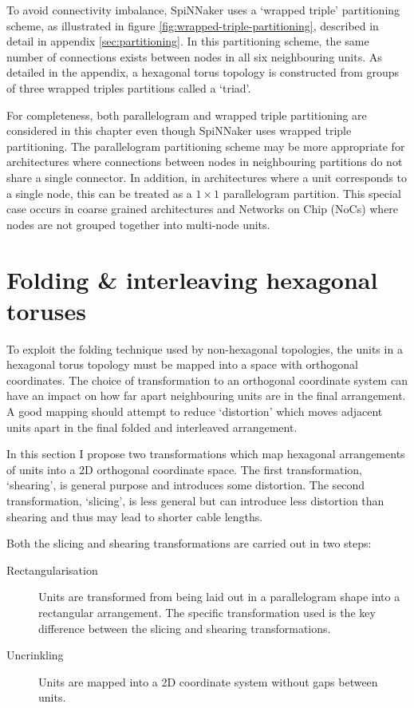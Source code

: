 		To avoid connectivity imbalance, SpiNNaker uses a `wrapped triple'
		partitioning scheme, as illustrated in figure
		\ref{fig:wrapped-triple-partitioning}, described in detail in appendix
		\ref{sec:partitioning}. In this partitioning scheme, the same number of
		connections exists between nodes in all six neighbouring units. As detailed
		in the appendix, a hexagonal torus topology is constructed from groups of
		three wrapped triples partitions called a `triad'.
		
		For completeness, both parallelogram and wrapped triple partitioning are
		considered in this chapter even though SpiNNaker uses wrapped triple
		partitioning. The parallelogram partitioning scheme may be more appropriate
		for architectures where connections between nodes in neighbouring
		partitions do not share a single connector. In addition, in architectures
		where a unit corresponds to a single node, this can be treated as a $1
		\times 1$ parallelogram partition.  This special case occurs in coarse
		grained architectures and Networks on Chip (NoCs) where nodes are not
		grouped together into multi-node units.
	
	\section{Folding \& interleaving hexagonal toruses}
		
		To exploit the folding technique used by non-hexagonal topologies,
		the units in a hexagonal torus topology must be mapped into a space with
		orthogonal coordinates. The choice of transformation to an orthogonal
		coordinate system can have an impact on how far apart neighbouring units
		are in the final arrangement. A good mapping should attempt to reduce
		`distortion' which moves adjacent units apart in the final folded and
		interleaved arrangement.
		
		In this section I propose two transformations which map hexagonal
		arrangements of units into a 2D orthogonal coordinate space. The first
		transformation, `shearing', is general purpose and introduces some
		distortion. The second transformation, `slicing', is less general but can
		introduce less distortion than shearing and thus may lead to shorter cable
		lengths.
		
		Both the slicing and shearing transformations are carried out in two steps:
		
		\begin{description}
			
			\item[Rectangularisation] Units are transformed from being laid out in a
			parallelogram shape into a rectangular arrangement. The specific
			transformation used is the key difference between the slicing and
			shearing transformations.
			
			\item[Uncrinkling] Units are mapped into a 2D coordinate system without
			gaps between units.
			
		\end{description}
		
